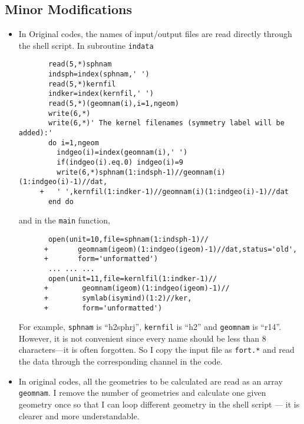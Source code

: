 \documentclass[aps,pra,groupedaddress,
                amsfonts,amssymb,
                preprint
    ]{revtex4}
\newcommand{\code}[1]{\texttt{#1}}
\begin{document}
\subsection{Minor Modifications}
\label{sec:minor-modifications}
\begin{itemize}
\item In Original codes, the names of input/output files are read
  directly through the shell script. In subroutine \code{indata}
\begin{verbatim}
       read(5,*)sphnam
       indsph=index(sphnam,' ')
       read(5,*)kernfil
       indker=index(kernfil,' ')
       read(5,*)(geomnam(i),i=1,ngeom)
       write(6,*)
       write(6,*)' The kernel filenames (symmetry label will be added):'
       do i=1,ngeom
         indgeo(i)=index(geomnam(i),' ')
         if(indgeo(i).eq.0) indgeo(i)=9
         write(6,*)sphnam(1:indsph-1)//geomnam(i)(1:indgeo(i)-1)//dat,
     +   ' ',kernfil(1:indker-1)//geomnam(i)(1:indgeo(i)-1)//dat
       end do
\end{verbatim}
and in the \code{main} function,
\begin{verbatim}
       open(unit=10,file=sphnam(1:indsph-1)//
      +       geomnam(igeom)(1:indgeo(igeom)-1)//dat,status='old',
      +       form='unformatted')
       ... ... ...
       open(unit=11,file=kernlfil(1:indker-1)//
      +        geomnam(igeom)(1:indgeo(igeom)-1)//
      +        symlab(isymind)(1:2)//ker,
      +        form='unformatted')
\end{verbatim}
  For example, \code{sphnam} is ``h2sphrj'', \code{kernfil} is ``h2''
  and \code{geomnam} is ``r14''. However, it is not convenient since
  every name should be less than 8 characters---it is often forgotten.
  So I copy the input file as \code{fort.*} and read the data through
  the corresponding channel in the code.
\item In original codes, all the geometries to be calculated are read as
  an array \code{geomnam}. I remove the number of geometries and
  calculate one given geometry once so that I can loop different
  geometry in the shell script --- it is clearer and more understandable.
\end{itemize}
\end{document}
